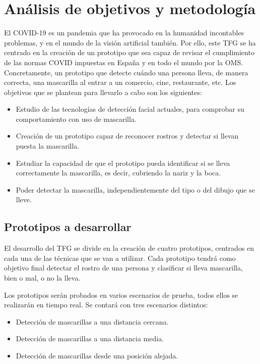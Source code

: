 
\lstset{frame=single,basicstyle=\ttfamily\small}

\chapter{Análisis de objetivos y metodología}
\vspace{-1cm}
El COVID-19 es un pandemia que ha provocado en la humanidad incontables problemas, y en el mundo de la visión artificial también. Por ello, este TFG se ha centrado en la creación de un prototipo que sea capaz de revisar el cumplimiento de las normas COVID impuestas en España y en todo el mundo por la OMS. Concretamente, un prototipo que detecte cuándo una persona lleva, de manera correcta, una mascarilla al entrar a un comercio, cine, restaurante, etc. Los objetivos que se plantean para llevarlo a cabo son los siguientes:

\begin{itemize}
	\item Estudio de las tecnologías de detección facial actuales, para comprobar su comportamiento con uso de mascarilla.
	\item Creación de un prototipo capaz de reconocer rostros y detectar si llevan puesta la mascarilla.
	\item Estudiar la capacidad de que el prototipo pueda identificar si se lleva correctamente la mascarilla, es decir, cubriendo la nariz y la boca. 
	\item Poder detectar la mascarilla, independientemente del tipo o del dibujo que se lleve.
\end{itemize}
\vspace{-0.7cm}
\section{Prototipos a desarrollar}
\vspace{-0.5cm}

El desarrollo del TFG se divide en la creación de cuatro prototipos, centrados en cada una de las técnicas que se van a utilizar. Cada prototipo tendrá como objetivo final detectar el rostro de una persona y clasificar si lleva mascarilla, bien o mal, o no la lleva.

Los prototipos serán probados en varios escenarios de prueba, todos ellos se realizarán en tiempo real. Se contará con tres escenarios distintos:

\begin{itemize}
	\item Detección de mascarillas a una distancia cercana.
	\item Detección de mascarillas a una distancia media.
	\item Detección de mascarillas desde una posición alejada.
\end{itemize}

